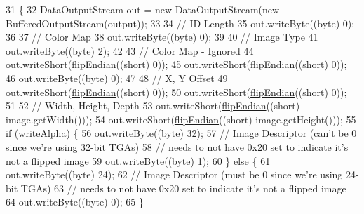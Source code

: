\begin{DoxyCode}
31                                                                                                            
             \{
32         DataOutputStream out = \textcolor{keyword}{new} DataOutputStream(\textcolor{keyword}{new} BufferedOutputStream(output));
33 
34         \textcolor{comment}{// ID Length}
35         out.writeByte((byte) 0);
36 
37         \textcolor{comment}{// Color Map}
38         out.writeByte((byte) 0);
39 
40         \textcolor{comment}{// Image Type}
41         out.writeByte((byte) 2);
42 
43         \textcolor{comment}{// Color Map - Ignored}
44         out.writeShort(\mbox{\hyperlink{classorg_1_1newdawn_1_1slick_1_1imageout_1_1_t_g_a_writer_a4e948a3f07436f54031b6f230a634a28}{flipEndian}}((\textcolor{keywordtype}{short}) 0));
45         out.writeShort(\mbox{\hyperlink{classorg_1_1newdawn_1_1slick_1_1imageout_1_1_t_g_a_writer_a4e948a3f07436f54031b6f230a634a28}{flipEndian}}((\textcolor{keywordtype}{short}) 0));
46         out.writeByte((byte) 0);
47 
48         \textcolor{comment}{// X, Y Offset}
49         out.writeShort(\mbox{\hyperlink{classorg_1_1newdawn_1_1slick_1_1imageout_1_1_t_g_a_writer_a4e948a3f07436f54031b6f230a634a28}{flipEndian}}((\textcolor{keywordtype}{short}) 0));
50         out.writeShort(\mbox{\hyperlink{classorg_1_1newdawn_1_1slick_1_1imageout_1_1_t_g_a_writer_a4e948a3f07436f54031b6f230a634a28}{flipEndian}}((\textcolor{keywordtype}{short}) 0));
51 
52         \textcolor{comment}{// Width, Height, Depth}
53         out.writeShort(\mbox{\hyperlink{classorg_1_1newdawn_1_1slick_1_1imageout_1_1_t_g_a_writer_a4e948a3f07436f54031b6f230a634a28}{flipEndian}}((\textcolor{keywordtype}{short}) image.getWidth()));
54         out.writeShort(\mbox{\hyperlink{classorg_1_1newdawn_1_1slick_1_1imageout_1_1_t_g_a_writer_a4e948a3f07436f54031b6f230a634a28}{flipEndian}}((\textcolor{keywordtype}{short}) image.getHeight()));
55         \textcolor{keywordflow}{if} (writeAlpha) \{
56             out.writeByte((byte) 32);
57             \textcolor{comment}{// Image Descriptor (can't be 0 since we're using 32-bit TGAs)}
58             \textcolor{comment}{// needs to not have 0x20 set to indicate it's not a flipped image}
59             out.writeByte((byte) 1);
60         \} \textcolor{keywordflow}{else} \{
61             out.writeByte((byte) 24);
62             \textcolor{comment}{// Image Descriptor (must be 0 since we're using 24-bit TGAs)}
63             \textcolor{comment}{// needs to not have 0x20 set to indicate it's not a flipped image}
64             out.writeByte((byte) 0);
65         \}

\end{DoxyCode}
